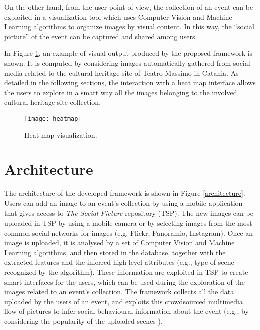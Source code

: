 On the other hand, from the user point of view, the collection of an event can be exploited in a visualization tool which uses Computer Vision and Machine Learning algorithms to organize images by visual content. In this way, the ``social picture'' of the event can be captured and shared among users.

In Figure \ref{heatmap}, an example of visual output produced by the proposed framework is shown. It is computed by considering images automatically gathered from social media related to the cultural heritage site of Teatro Massimo in Catania. As detailed in the following sections, the interaction with a heat map interface allows the users to explore in a smart way all the images belonging to the involved cultural heritage site collection.

\begin{figure}
	\centering
	\texttt{[image: heatmap]}
	\vspace{-0.7cm}
	\caption{Heat map visualization.}
	\label{heatmap}
\end{figure}

\section{Architecture}
The architecture of the developed framework is shown in Figure \ref{architecture}.
Users can add an image to an event's collection by using a mobile application that gives access to \textit{The Social Picture} repository (TSP). The new images can be uploaded in TSP by using a mobile camera or by selecting images from the most common social networks for images (e.g. Flickr, Panoramio, Instagram).
Once an image is uploaded, it is analysed by a set of Computer Vision and Machine Learning algorithms, and then stored in the database, together with the extracted features and the inferred high level attributes (e.g., type of scene recognized by the algorithm). These information are exploited in TSP to create smart interfaces for the users, which can be used during the exploration of the images related to an event's collection.
The framework collects all the data uploaded by the users of an event, and exploits this crowdsourced multimedia flow of pictures to infer social behavioural information about the event (e.g., by considering the popularity of the uploaded scenes \cite{Ortis2015n525}).

